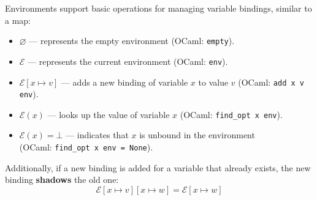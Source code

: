         
\newpage 

\noindent

\begin{Def}

    \label{def:env-operations}

    \noindent
    Environments support basic operations for managing variable bindings, similar to a map:

    \begin{itemize}
        \item \(\varnothing\) — represents the empty environment (OCaml: \texttt{empty}).
        \item \(\mathcal{E}\) — represents the current environment (OCaml: \texttt{env}).
        \item \(\mathcal{E}[x \mapsto v]\) — adds a new binding of variable \(x\) to value \(v\) (OCaml: \texttt{add x v env}).
        
        \item \(\mathcal{E}(x)\) — looks up the value of variable \(x\) (OCaml: \texttt{find\_opt x env}).
        
        \item \(\mathcal{E}(x) = \bot\) — indicates that \(x\) is unbound in the environment\\ (OCaml: \texttt{find\_opt x env = None}).
    \end{itemize}

    \noindent
    Additionally, if a new binding is added for a variable that already exists, the new binding \textbf{shadows} the old one:
    \[
    \mathcal{E}[x \mapsto v][x \mapsto w] = \mathcal{E}[x \mapsto w]
    \]
\end{Def}
